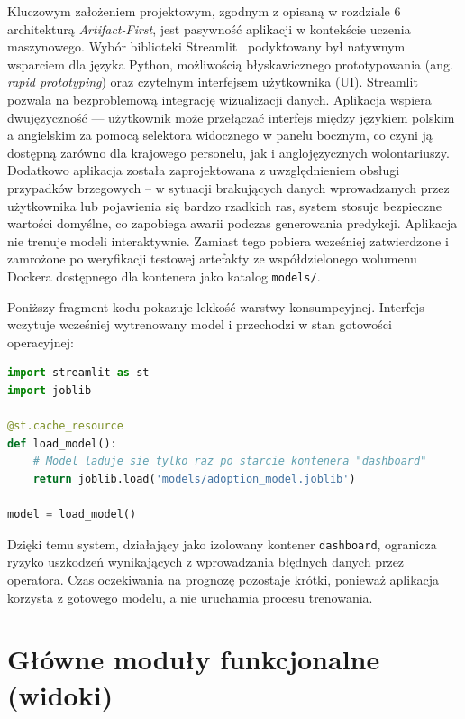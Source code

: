 Kluczowym założeniem projektowym, zgodnym z opisaną w rozdziale 6 architekturą \emph{Artifact-First}, jest pasywność aplikacji w kontekście uczenia maszynowego. Wybór biblioteki Streamlit~\cite{Streamlit2023} podyktowany był natywnym wsparciem dla języka Python, możliwością błyskawicznego prototypowania (ang. \emph{rapid prototyping}) oraz czytelnym interfejsem użytkownika (UI). Streamlit pozwala na bezproblemową integrację wizualizacji danych. Aplikacja wspiera dwujęzyczność --- użytkownik może przełączać interfejs między językiem polskim a angielskim za pomocą selektora widocznego w panelu bocznym, co czyni ją dostępną zarówno dla krajowego personelu, jak i anglojęzycznych wolontariuszy. Dodatkowo aplikacja została zaprojektowana z uwzględnieniem obsługi przypadków brzegowych -- w sytuacji brakujących danych wprowadzanych przez użytkownika lub pojawienia się bardzo rzadkich ras, system stosuje bezpieczne wartości domyślne, co zapobiega awarii podczas generowania predykcji. Aplikacja nie trenuje modeli interaktywnie. Zamiast tego pobiera wcześniej zatwierdzone i zamrożone po weryfikacji testowej artefakty ze współdzielonego wolumenu Dockera dostępnego dla kontenera jako katalog \texttt{models/}.

Poniższy fragment kodu pokazuje lekkość warstwy konsumpcyjnej. Interfejs wczytuje wcześniej wytrenowany model i przechodzi w stan gotowości operacyjnej:

\begin{lstlisting}[language=Python,caption={Mechanizm buforowania wczytywania modelu zapobiegający degradacji wydajności},label={lst:dashboard-load-model}]
import streamlit as st
import joblib

@st.cache_resource
def load_model():
    # Model laduje sie tylko raz po starcie kontenera "dashboard"
    return joblib.load('models/adoption_model.joblib')

model = load_model()
\end{lstlisting}

Dzięki temu system, działający jako izolowany kontener \texttt{dashboard}, ogranicza ryzyko uszkodzeń wynikających z wprowadzania błędnych danych przez operatora. Czas oczekiwania na prognozę pozostaje krótki, ponieważ aplikacja korzysta z gotowego modelu, a nie uruchamia procesu trenowania.

\section{Główne moduły funkcjonalne (widoki)}
\label{sec:glowne-moduly-funkcjonalne-widoki}

